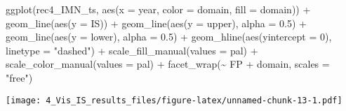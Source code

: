 \documentclass[
]{article}
\newenvironment{Shaded}{\begin{snugshade}}{\end{snugshade}}
\newcommand{\AttributeTok}[1]{\textcolor[rgb]{0.77,0.63,0.00}{#1}}
\newcommand{\DecValTok}[1]{\textcolor[rgb]{0.00,0.00,0.81}{#1}}
\newcommand{\FloatTok}[1]{\textcolor[rgb]{0.00,0.00,0.81}{#1}}
\newcommand{\FunctionTok}[1]{\textcolor[rgb]{0.00,0.00,0.00}{#1}}
\newcommand{\NormalTok}[1]{#1}
\newcommand{\SpecialCharTok}[1]{\textcolor[rgb]{0.00,0.00,0.00}{#1}}
\newcommand{\StringTok}[1]{\textcolor[rgb]{0.31,0.60,0.02}{#1}}
\begin{document}
\begin{Shaded}
\begin{Highlighting}[]
\FunctionTok{ggplot}\NormalTok{(rec4\_IMN\_ts, }\FunctionTok{aes}\NormalTok{(}\AttributeTok{x =}\NormalTok{ year, }\AttributeTok{color =}\NormalTok{ domain, }\AttributeTok{fill =}\NormalTok{ domain)) }\SpecialCharTok{+}
  \FunctionTok{geom\_line}\NormalTok{(}\FunctionTok{aes}\NormalTok{(}\AttributeTok{y =}\NormalTok{ IS)) }\SpecialCharTok{+}
  \FunctionTok{geom\_line}\NormalTok{(}\FunctionTok{aes}\NormalTok{(}\AttributeTok{y =}\NormalTok{ upper), }\AttributeTok{alpha =} \FloatTok{0.5}\NormalTok{) }\SpecialCharTok{+}
  \FunctionTok{geom\_line}\NormalTok{(}\FunctionTok{aes}\NormalTok{(}\AttributeTok{y =}\NormalTok{ lower), }\AttributeTok{alpha =} \FloatTok{0.5}\NormalTok{) }\SpecialCharTok{+}
  \FunctionTok{geom\_hline}\NormalTok{(}\FunctionTok{aes}\NormalTok{(}\AttributeTok{yintercept =} \DecValTok{0}\NormalTok{),}
             \AttributeTok{linetype =} \StringTok{"dashed"}\NormalTok{) }\SpecialCharTok{+}
    \FunctionTok{scale\_fill\_manual}\NormalTok{(}\AttributeTok{values =}\NormalTok{ pal) }\SpecialCharTok{+}
  \FunctionTok{scale\_color\_manual}\NormalTok{(}\AttributeTok{values =}\NormalTok{ pal) }\SpecialCharTok{+}
     \FunctionTok{facet\_wrap}\NormalTok{(}\SpecialCharTok{\textasciitilde{}}\NormalTok{ FP }\SpecialCharTok{+}\NormalTok{ domain, }\AttributeTok{scales =} \StringTok{"free"}\NormalTok{)}
\end{Highlighting}
\end{Shaded}

\texttt{[image: 4\_Vis\_IS\_results\_files/figure-latex/unnamed-chunk-13-1.pdf]}
\end{document}
